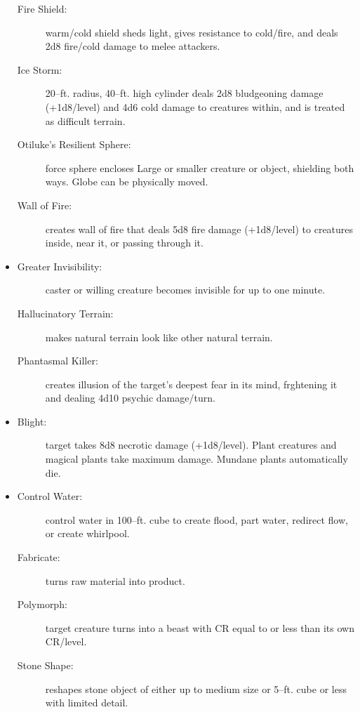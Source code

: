 \documentclass[DIV=14, paper=a4, fontsize=10pt, twocolumn, twoside]{scrartcl}
\begin{document}
\begin{itemize}[align=parleft,labelwidth=1cm]
\begin{description}
 \item[Fire Shield:] warm/cold shield sheds light, gives resistance to cold/fire, and deals 2d8 fire/cold damage to melee attackers.
 \item[Ice Storm:] 20–ft. radius, 40–ft. high cylinder deals 2d8 bludgeoning damage (+1d8/level) and 4d6 cold damage to creatures within, and is treated as difficult terrain.
 \item[Otiluke’s Resilient Sphere:] force sphere encloses Large or smaller creature or object, shielding both ways. Globe can be physically moved.
 \item[Wall of Fire:] creates wall of fire that deals 5d8 fire damage (+1d8/level) to creatures inside, near it, or passing through it.
\end{description}
\renewcommand{\labelitemi}{Illus}\item
\begin{description}
 \item[Greater Invisibility:] caster or willing creature becomes invisible for up to one minute.
 \item[Hallucinatory Terrain:] makes natural terrain look like other natural terrain.
 \item[Phantasmal Killer:] creates illusion of the target’s deepest fear in its mind, frghtening it and dealing 4d10 psychic damage/turn.
\end{description}
\renewcommand{\labelitemi}{Necro}\item
\begin{description}
 \item[Blight:] target takes 8d8 necrotic damage (+1d8/level). Plant creatures and magical plants take maximum damage. Mundane plants automatically die.
\end{description}
\renewcommand{\labelitemi}{Trans}\item
\begin{description}
 \item[Control Water:] control water in 100–ft. cube to create flood, part water, redirect flow, or create whirlpool.
 \item[Fabricate:] turns raw material into product.
 \item[Polymorph:] target creature turns into a beast with CR equal to or less than its own CR/level.
 \item[Stone Shape:] reshapes stone object of either up to medium size or 5–ft. cube or less with limited detail.
\end{description}
\end{itemize}
\end{document}
